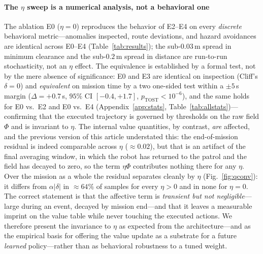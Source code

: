 \paragraph*{The $\eta$ sweep is a numerical analysis, not a behavioral one}
The ablation E0 ($\eta=0$) reproduces the behavior
of E2--E4 on every \emph{discrete} behavioral metric---anomalies inspected,
route deviations, and hazard avoidances are identical across E0--E4
(Table~\ref{tab:results}); the sub-$0.03$\,m spread in minimum clearance and the
sub-$0.2$\,m spread in distance are run-to-run stochasticity, not an $\eta$
effect. The equivalence is established by a formal test, not by the mere absence of
significance: E0 and E3 are identical on inspection (Cliff's $\delta=0$) and
\emph{equivalent} on mission time by a two one-sided test within a $\pm5$\,s margin
($\Delta=+0.7$\,s, $95\%$ CI $[-0.4,+1.7]$, $p_{\mathrm{TOST}}<10^{-6}$), and the
same holds for E0 vs.\ E2 and E0 vs.\ E4 (Appendix~\ref{app:stats},
Table~\ref{tab:allstats})---confirming that the executed trajectory is governed by
thresholds on the raw field $\Phi$ and is invariant to $\eta$. The internal value quantities, by contrast, \emph{are}
affected, and the previous version of this article understated this: the
end-of-mission residual is indeed comparable across $\eta$ ($\approx0.02$), but that
is an artifact of the final averaging window, in which the robot has returned to the
patrol and the field has decayed to zero, so the term $\eta\Phi$ contributes nothing
there for any $\eta$. Over the mission as a whole the residual separates cleanly by
$\eta$ (Fig.~\ref{fig:qconv}): it differs from $\alpha|\delta|$ in ${\approx}64\%$ of
samples for every $\eta>0$ and in none for $\eta=0$. The correct statement is that
the affective term is \emph{transient but not negligible}---large during an event,
decayed by mission end---and that it leaves a measurable imprint on the value table
while never touching the executed actions. We therefore
present the invariance to $\eta$ as expected from the architecture---and as the
empirical basis for offering the value update as a substrate for a future
\emph{learned} policy---rather than as behavioral robustness to a tuned weight.

